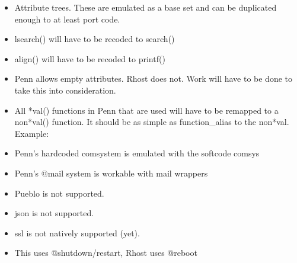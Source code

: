 \documentclass[letterpaper,10pt,english]{sphinxmanual}
\begin{document}
\label{\detokenize{differences:id2}}\begin{itemize}
\item {} 
\sphinxAtStartPar
Attribute trees.  These are emulated as a base set and can be duplicated enough to at least port code.

\item {} 
\sphinxAtStartPar
lsearch() will have to be recoded to search()

\item {} 
\sphinxAtStartPar
align() will have to be recoded to printf()

\item {} 
\sphinxAtStartPar
Penn allows empty attributes.  Rhost does not.  Work will have to be done to take this into consideration.

\item {} 
\sphinxAtStartPar
All *val() functions in Penn that are used will have to be remapped to a non\sphinxhyphen{}*val() function.  It should be as simple as function\_alias to the non\sphinxhyphen{}*val.  Example:

\begin{sphinxVerbatim}[commandchars=\\\{\}]
  
\end{sphinxVerbatim}

\item {} 
\sphinxAtStartPar
Penn’s hardcoded comsystem is emulated with the softcode comsys

\item {} 
\sphinxAtStartPar
Penn’s @mail system is workable with mail wrappers

\item {} 
\sphinxAtStartPar
Pueblo is not supported.

\item {} 
\sphinxAtStartPar
json is not supported.

\item {} 
\sphinxAtStartPar
ssl is not natively supported (yet).

\item {} 
\sphinxAtStartPar
This uses @shutdown/restart, Rhost uses @reboot

\end{itemize}
\end{document}
